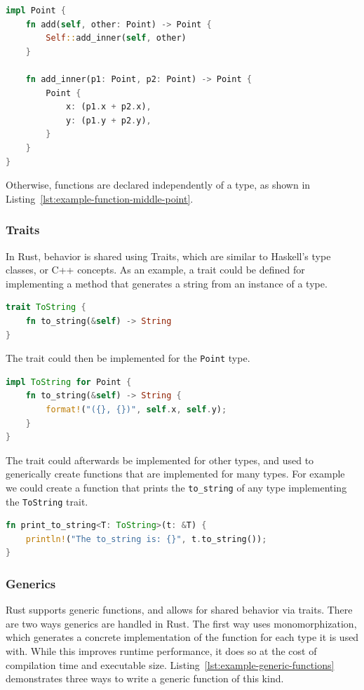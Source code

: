 \documentclass{article}
\begin{document}
\begin{lstlisting}[language=Rust, style=boxed, caption=Associating behavior with the point defined in Listing~\ref{lst:example-struct}, label=lst:example-struct-method]
impl Point {
    fn add(self, other: Point) -> Point {
        Self::add_inner(self, other)
    }

    fn add_inner(p1: Point, p2: Point) -> Point {
        Point {
            x: (p1.x + p2.x),
            y: (p1.y + p2.y),
        }
    }
}
\end{lstlisting}

Otherwise, functions are declared independently of a type, as shown in Listing~\ref{lst:example-function-middle-point}.

\subsubsection{Traits}
In Rust, behavior is shared using Traits, which are similar to Haskell’s type classes, or C++ concepts. As an example, a trait could be defined for implementing a method that generates a string from an instance of a type.

\begin{lstlisting}[language=Rust, style=boxed, caption=Trait definition, label=lst:example-trait]
trait ToString {
    fn to_string(&self) -> String
}
\end{lstlisting}

The trait could then be implemented for the \lstinline{Point} type.

\begin{lstlisting}[language=Rust, style=boxed, caption=Trait implementation, label=lst:example-trait-implementation]
impl ToString for Point {
    fn to_string(&self) -> String {
        format!("({}, {})", self.x, self.y);
    }
}
\end{lstlisting}
The trait could afterwards be implemented for other types, and used to generically create functions that are implemented for many types. For example we could create a function that prints the \lstinline{to_string} of any type implementing the \lstinline{ToString} trait.

\begin{lstlisting}[language=Rust, style=boxed, caption=Trait consumption, label=lst:example-trait-consumption]
fn print_to_string<T: ToString>(t: &T) {
    println!("The to_string is: {}", t.to_string());
}
\end{lstlisting}

\subsubsection{Generics}
Rust supports generic functions, and allows for shared behavior via traits. There are two ways generics are handled in Rust. The first way uses monomorphization, which generates a concrete implementation of the function for each type it is used with. While this improves runtime performance, it does so at the cost of compilation time and executable size. Listing~\ref{lst:example-generic-functions} demonstrates three ways to write a generic function of this kind.
\end{document}
